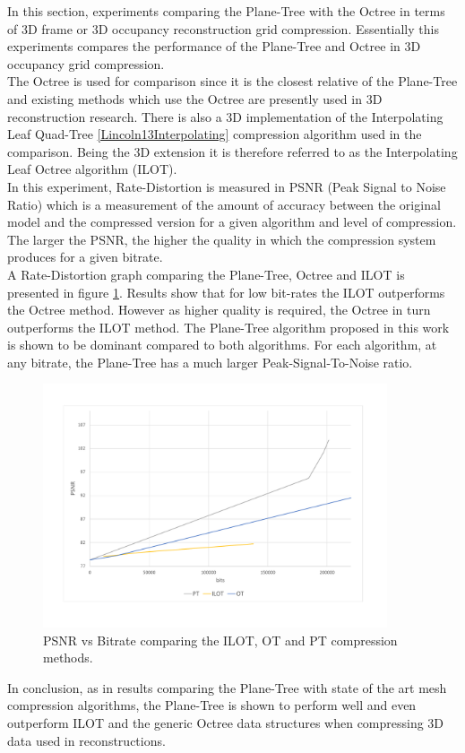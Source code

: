 
In this section, experiments comparing the Plane-Tree with the Octree in terms of 3D frame or 3D occupancy reconstruction grid compression. Essentially this experiments compares the performance of the Plane-Tree and Octree in 3D occupancy grid compression. \\

The Octree is used for comparison since it is the closest relative of the Plane-Tree and existing methods which use the Octree are presently used in 3D reconstruction research. There is also a 3D implementation of the Interpolating Leaf Quad-Tree \ref{Lincoln13Interpolating} compression algorithm used in the comparison. Being the 3D extension it is therefore referred to as the Interpolating Leaf Octree algorithm (ILOT). \\

In this experiment, Rate-Distortion is measured in PSNR (Peak Signal to Noise Ratio) which is a measurement of the amount of accuracy between the original model and the compressed version for a given algorithm and level of compression. The larger the PSNR, the higher the quality in which the compression system produces for a given bitrate. \\

A Rate-Distortion graph comparing the Plane-Tree, Octree and ILOT is presented in figure \ref{fig:3DReconCompression1}. Results show that for low bit-rates the ILOT outperforms the Octree method. However as higher quality is required, the Octree in turn outperforms the ILOT method. The Plane-Tree algorithm proposed in this work is shown to be dominant compared to both algorithms. For each algorithm, at any bitrate, the Plane-Tree has a much larger Peak-Signal-To-Noise ratio. \\

\begin{figure}[!htb]
\centering
\includegraphics[width=4.0in]{images/results/compression/psnr1}
\caption{PSNR vs Bitrate comparing the ILOT, OT and PT compression methods.}
\label{fig:3DReconCompression1}
\end{figure}

In conclusion, as in results comparing the Plane-Tree with state of the art mesh compression algorithms, the Plane-Tree is shown to perform well and even outperform ILOT and the generic Octree data structures when compressing 3D data used in reconstructions. 
